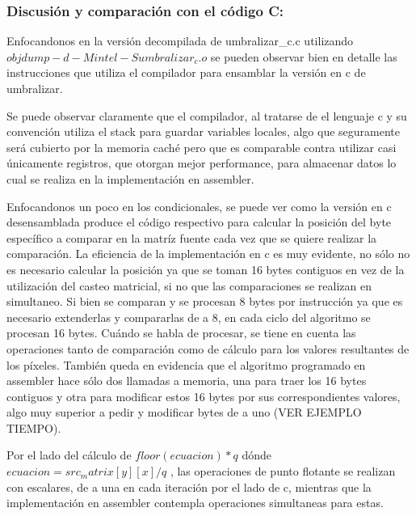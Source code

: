 \subsubsection{Discusión y comparación con el código C:}
Enfocandonos en la versión decompilada de umbralizar\_c.c utilizando $objdump -d -M intel -S umbralizar_c.o$ se pueden observar bien en detalle las instrucciones que utiliza el compilador para ensamblar la versión en c de umbralizar.

Se puede observar claramente que el compilador, al tratarse de el lenguaje c y su convención utiliza el stack para guardar variables locales, algo que seguramente será cubierto por la memoria caché pero que es comparable contra utilizar casi únicamente registros, que otorgan mejor performance, para almacenar datos lo cual se realiza en la implementación en assembler.

Enfocandonos un poco en los condicionales, se puede ver como la versión en c desensamblada produce el código respectivo para calcular la posición del byte específico a comparar en la matríz fuente cada vez que se quiere realizar la comparación. La eficiencia de la implementación en c es muy evidente, no sólo no es necesario calcular la posición ya que se toman 16 bytes contiguos en vez de la utilización del casteo matricial, si no que las comparaciones se realizan en simultaneo. Si bien se comparan y se procesan 8 bytes por instrucción ya que es necesario extenderlas y compararlas de a 8, en cada ciclo del algoritmo se procesan 16 bytes. Cuándo se habla de procesar, se tiene en cuenta las operaciones tanto de comparación como de cálculo para los valores resultantes de los píxeles. También queda en evidencia que el algoritmo programado en assembler hace sólo dos llamadas a memoria, una para traer los 16 bytes contiguos y otra para modificar estos 16 bytes por sus correspondientes valores, algo muy superior a pedir y modificar bytes de a uno (VER EJEMPLO TIEMPO).

Por el lado del cálculo de $floor(ecuacion) * q$ dónde $ecuacion = src_matrix[y][x] / q$ , las operaciones de punto flotante se realizan con escalares, de a una en cada iteración por el lado de c, mientras que la implementación en assembler contempla operaciones simultaneas para estas.